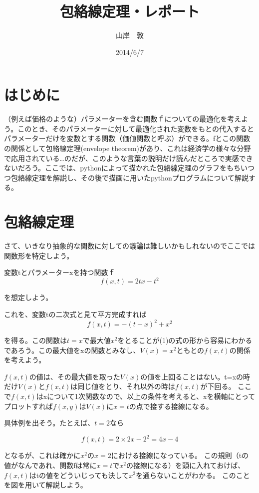 \documentclass[11pt,a4j,fleqn]{jarticle}
\title{包絡線定理・レポート}
\author{山岸　敦}
\date{2014/6/7}
\begin{document}
\maketitle

\section{はじめに}

（例えば価格のような）パラメーターを含む関数ｆについての最適化を考えよう。このとき、そのパラメーターに対して最適化された変数をもとの代入するとパラメーターだけを変数とする関数（価値関数と呼ぶ）ができる。fとこの関数の関係として包絡線定理(envelope theorem)があり、これは経済学の様々な分野で応用されている…のだが、このような言葉の説明だけ読んだところで実感できないだろう。ここでは、pythonによって描かれた包絡線定理のグラフをもちいつつ包絡線定理を解説し、その後で描画に用いたpythonプログラムについて解説する。


\section{包絡線定理}

さて、いきなり抽象的な関数に対しての議論は難しいかもしれないのでここでは関数形を特定しよう。

変数tとパラメーターxを持つ関数ｆ
\[
f(x, t) =2 t x - t^2
\]

を想定しよう。

これを、変数tの二次式と見て平方完成すれば
\begin{equation}
f(x, t)  = -(t - x)^2 + x^2 \label{eq:square-1}
\end{equation}

を得る。この関数は$t=x$で最大値$x^2$をとることが(1)の式の形から容易にわかるであろう。この最大値をxの関数とみなし、$V(x)=x^2$ともとの$f(x,t)$の関係を考えよう。

$f(x,t)$の値は、その最大値を取った$V(x)$の値を上回ることはない。t=xの時だけ$V(x)$と$f(x,t)$は同じ値をとり、それ以外の時は$f(x,t)$が下回る。
ここで$f(x,t)$はxについて1次関数なので、以上の条件を考えると、xを横軸にとってプロットすれば$f(x,y)$は$V(x)$に$x=t$の点で接する接線になる。

具体例を出そう。たとえば、$t=2$なら

\begin{equation}
f(x, t) = 2×2x-2^2 = 4x-4
\end{equation}

となるが、これは確かに$x^2$の$x=2$における接線になっている。
この規則（tの値がなんであれ、関数fは常に$x=t$で$x^2$の接線になる）を頭に入れておけば、$f(x,t)$はtの値をどういじっても決して$x^2$を通らないことがわかる。
このことを図を用いて解説しよう。
\end{document}

